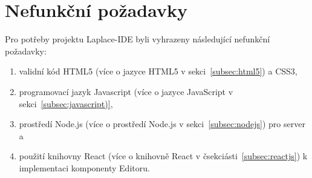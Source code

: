 \section{Nefunkční požadavky}\label{sec:nefuncniPozadavky}

Pro potřeby projektu Laplace-IDE byli vyhrazeny následující nefunkční požadavky:
\begin{enumerate}[label=N\arabic*.]
    \item validní kód HTML5 (více o jazyce HTML5 v sekci~\ref{subsec:html5}) a \gls{CSS3},
    \item programovací jazyk Javascript (více o jazyce JavaScript v sekci~\ref{subsec:javascript)},
    \item prostředí Node.js (více o prostředí Node.js v sekci~\ref{subsec:nodejs}) pro server a
    \item použití knihovny React (více o knihovně React v čsekciásti~\ref{subsec:reactjs}) k implementaci komponenty Editoru.
\end{enumerate}
